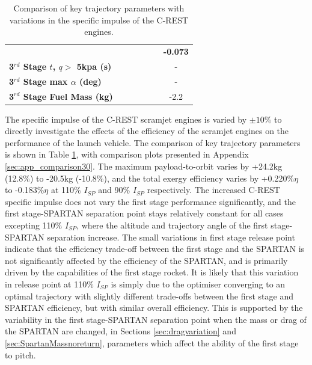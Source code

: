 \begin{table}[ht!]
\begin{tabular}{l c c c c c c}
		& \textbf{\thirddExergyEffIspNinetyNoReturn}
		& \textbf{\thirddExergyEffIspNinetyFiveNoReturn}
		& \textbf{\thirddExergyEffIspStandardNoReturn}
		& \textbf{\thirddExergyEffIspOneHundredFiveNoReturn}
		& \textbf{\thirddExergyEffIspOneHundredTenNoReturn}
		& \textbf{-0.073}
		\\
		\textbf{3$^{rd}$ Stage $t$, $q >$ 5kpa (s)}
		& \thirdqOverFiveIspNinetyNoReturn
		& \thirdqOverFiveIspNinetyFiveNoReturn
		& \thirdqOverFiveIspStandardNoReturn
		& \thirdqOverFiveIspOneHundredFiveNoReturn
		& \thirdqOverFiveIspOneHundredTenNoReturn
		& -
		\\
		\textbf{3$^{rd}$ Stage max $\alpha$ (deg)}
		& \thirdmaxAoAIspNinetyNoReturn
		& \thirdmaxAoAIspNinetyFiveNoReturn
		& \thirdmaxAoAIspStandardNoReturn
		& \thirdmaxAoAIspOneHundredFiveNoReturn
		& \thirdmaxAoAIspOneHundredTenNoReturn
		& -
		\\
		\textbf{3$^{rd}$ Stage Fuel Mass (kg)}
		& \thirdmFuelIspNinetyNoReturn
		& \thirdmFuelIspNinetyFiveNoReturn
		& \thirdmFuelIspStandardNoReturn
		& \thirdmFuelIspOneHundredFiveNoReturn
		& \thirdmFuelIspOneHundredTenNoReturn
		&-2.2
		\\
		\hline 
	\end{tabular} 
	
	\caption{Comparison of key trajectory parameters with variations in the specific impulse of the C-REST engines.}
	\label{tab:comparison30}
\end{table}

The specific impulse of the C-REST scramjet engines is varied by $\pm10\%$ to directly investigate the effects of the efficiency of the scramjet engines on the performance of the launch vehicle. The comparison of key trajectory parameters is shown in Table \ref{tab:comparison30}, with comparison plots presented in Appendix \ref{sec:app_comparison30}. The maximum payload-to-orbit varies by +24.2kg (12.8\%) to -20.5kg (-10.8\%), and the total exergy efficiency varies by +0.220\%$\eta$ to -0.183\%$\eta$ at 110\% $I_{SP}$ and 90\% $I_{SP}$ respectively. 
The increased C-REST specific impulse does not vary the first stage performance significantly, and the first stage-SPARTAN separation point stays relatively constant for all cases excepting 110\% $I_{SP}$, where the altitude and trajectory angle of the first stage-SPARTAN separation increase.   
The small variations in first stage release point indicate that the efficiency trade-off between the first stage and the SPARTAN is not significantly affected by the efficiency of the SPARTAN, and is primarily driven by the capabilities of the first stage rocket. 
It is likely that this variation in release point at 110\% $I_{SP}$ is simply due to the optimiser converging to an optimal trajectory with slightly different trade-offs between the first stage and SPARTAN efficiency, but with similar overall efficiency.
This is supported by the variability in the first stage-SPARTAN separation point when the mass or drag of the SPARTAN are changed, in Sections \ref{sec:dragvariation} and \ref{sec:SpartanMassnoreturn}, parameters which affect the ability of the first stage to pitch. 

